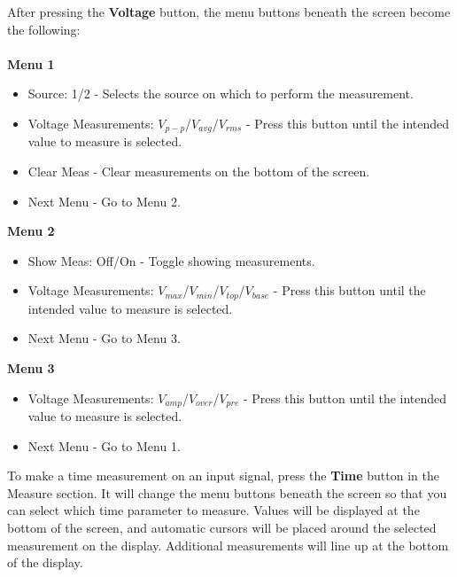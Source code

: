 \documentclass{article}
\begin{document}
After pressing the \textbf{Voltage} button, the menu buttons beneath the screen become the following:
~\\~\\
\textbf{Menu 1}
\begin{itemize}
\item Source: 1/2  -  Selects the source on which to perform the measurement.
\item Voltage Measurements: $V_{p-p}$/$V_{avg}$/$V_{rms}$  -  Press this button until the intended value to measure is selected.
\item Clear Meas  -  Clear measurements on the bottom of the screen.
\item Next Menu  -  Go to Menu 2.
\end{itemize}
\textbf{Menu 2}
\begin{itemize}
\item Show Meas: Off/On -  Toggle showing measurements.
\item Voltage Measurements: $V_{max}$/$V_{min}$/$V_{top}$/$V_{base}$  -  Press this button until the intended value to measure is selected.
\item Next Menu  -  Go to Menu 3.
\end{itemize}
\textbf{Menu 3}
\begin{itemize}
\item Voltage Measurements: $V_{amp}$/$V_{over}$/$V_{pre}$  -  Press this button until the intended value to measure is selected.
\item Next Menu  -  Go to Menu 1.
\end{itemize}

To make a time measurement on an input signal, press the \textbf{Time} button in the Measure section. It will change the menu buttons beneath the screen so that you can select which time parameter to measure. Values will be displayed at the bottom of the screen, and automatic cursors will be placed around the selected measurement on the display. Additional measurements will line up at the bottom of the display.
\end{document}

